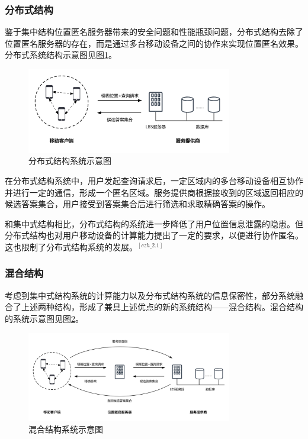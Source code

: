 \documentclass[zihao=-4]{ctexart}
\begin{document}
\subsubsection{分布式结构}
鉴于集中结构位置匿名服务器带来的安全问题和性能瓶颈问题，分布式结构去除了位置匿名服务器的存在，而是通过多台移动设备之间的协作来实现位置匿名效果。分布式系统结构示意图见图\ref{分布式结构}。
\begin{figure}[H] %
	\centering %
	\includegraphics[width=0.8\textwidth]{./include_picture/分布式点对点结构（绪论-研究现状）} %
	\caption{分布式结构系统示意图} %
	\label{分布式结构} %
\end{figure}

在分布式结构系统中，用户发起查询请求后，一定区域内的多台移动设备相互协作并进行一定的通信，形成一个匿名区域。服务提供商根据接收到的区域返回相应的候选答案集合，用户接受到答案集合后进行筛选和求取精确答案的操作。
\par
和集中式结构相比，分布式结构的系统进一步降低了用户位置信息泄露的隐患。但分布式结构也对用户移动设备的计算能力提出了一定的要求，以便进行协作匿名。这也限制了分布式结构系统的发展。$^{[czh\_2.1]}$

\subsubsection{混合结构}
考虑到集中式结构系统的计算能力以及分布式结构系统的信息保密性，部分系统融合了上述两种结构，形成了兼具上述优点的新的系统结构——混合结构。混合结构的系统示意图见图\ref{混合结构}。
\begin{figure}[H] %
	\centering %
	\includegraphics[width=0.8\textwidth]{./include_picture/混合结构（绪论-研究现状）} %
	\caption{混合结构系统示意图} %
	\label{混合结构} %
\end{figure}
\end{document}
